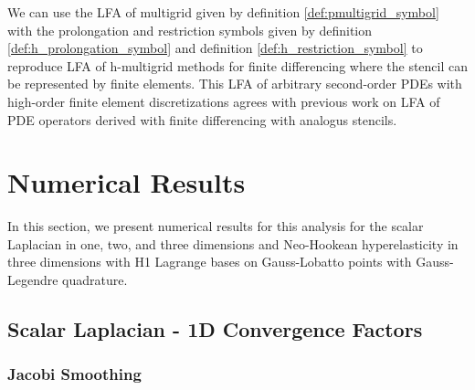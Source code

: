 \documentclass[review]{siamart190516}
\begin{document}
We can use the LFA of multigrid given by definition \ref{def:pmultigrid_symbol} with the prolongation and restriction symbols given by definition \ref{def:h_prolongation_symbol} and definition \ref{def:h_restriction_symbol} to reproduce LFA of h-multigrid methods for finite differencing where the stencil can be represented by finite elements.
This LFA of arbitrary second-order PDEs with high-order finite element discretizations agrees with previous work on LFA of PDE operators derived with finite differencing with analogus stencils.

\section{Numerical Results}\label{sec:results}

In this section, we present numerical results for this analysis for the scalar Laplacian in one, two, and three dimensions and Neo-Hookean hyperelasticity in three dimensions with H1 Lagrange bases on Gauss-Lobatto points with Gauss-Legendre quadrature.

\subsection{Scalar Laplacian - 1D Convergence Factors}\label{sec:1dresults}

\subsubsection{Jacobi Smoothing}
\end{document}
